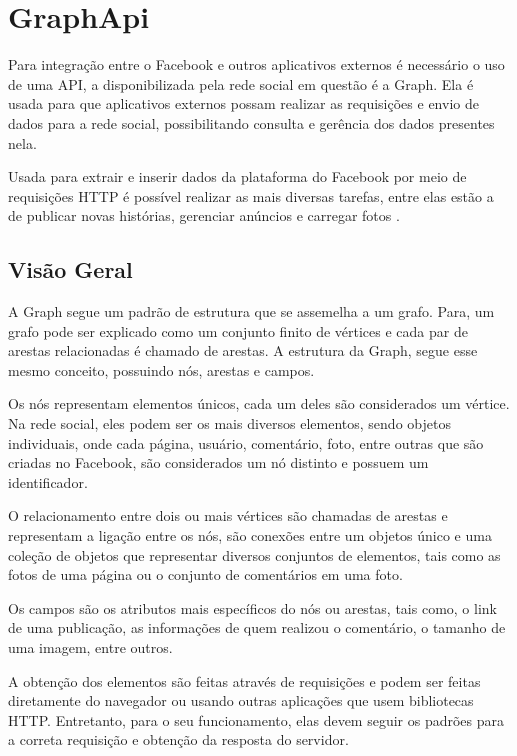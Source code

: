 \chapter[GraphApi]{GraphApi}
Para integração entre o Facebook e outros aplicativos externos é necessário o uso de uma API, a disponibilizada pela rede social em questão é a Graph. Ela é usada para que aplicativos externos possam realizar as requisições e envio de dados para a rede social, possibilitando consulta e gerência dos dados presentes nela. 

Usada para extrair e inserir dados da plataforma do Facebook por meio de requisições HTTP é possível realizar as mais diversas tarefas, entre elas estão a de publicar novas histórias, gerenciar anúncios e carregar fotos \cite{facebook2018b}.

\section{Visão Geral}
A Graph segue um padrão de estrutura que se assemelha a um grafo. Para\cite{soares2014}, um grafo pode ser explicado como um conjunto finito de vértices e cada par de arestas relacionadas é chamado de arestas. A estrutura da Graph, segue esse mesmo conceito, possuindo nós, arestas e campos. 

Os nós representam elementos únicos, cada um deles são considerados um vértice. Na rede social, eles podem ser os mais diversos elementos, sendo objetos individuais, onde cada página, usuário, comentário, foto, entre outras que são criadas no Facebook, são considerados um nó distinto \cite{facebook2018b} e possuem um identificador. 

O relacionamento entre dois ou mais vértices são chamadas de arestas e representam a ligação entre os nós, são conexões entre um objetos único e uma coleção de objetos que representar diversos conjuntos de elementos, tais como as fotos de uma página ou o conjunto de comentários em uma foto. 

Os campos são os atributos mais específicos do nós ou arestas, tais como, o link de uma publicação, as informações de quem realizou o comentário, o tamanho de uma imagem, entre outros.

A obtenção dos elementos são feitas através de requisições e podem ser feitas diretamente do navegador ou usando outras aplicações que usem bibliotecas HTTP. Entretanto, para o seu funcionamento, elas devem seguir os padrões para a correta requisição e obtenção da resposta do servidor. 

